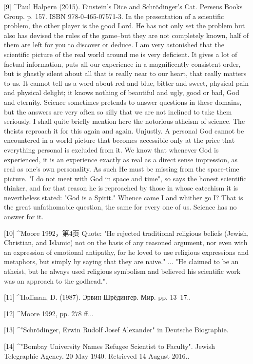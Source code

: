 [9]
^Paul Halpern (2015). Einstein's Dice and Schrödinger's Cat. Perseus Books Group. p. 157. ISBN 978-0-465-07571-3. In the presentation of a scientific problem, the other player is the good Lord. He has not only set the problem but also has devised the rules of the game--but they are not completely known, half of them are left for you to discover or deduce. I am very astonished that the scientific picture of the real world around me is very deficient. It gives a lot of factual information, puts all our experience in a magnificently consistent order, but is ghastly silent about all that is really near to our heart, that really matters to us. It cannot tell us a word about red and blue, bitter and sweet, physical pain and physical delight; it knows nothing of beautiful and ugly, good or bad, God and eternity. Science sometimes pretends to answer questions in these domains, but the answers are very often so silly that we are not inclined to take them seriously. I shall quite briefly mention here the notorious atheism of science. The theists reproach it for this again and again. Unjustly. A personal God cannot be encountered in a world picture that becomes accessible only at the price that everything personal is excluded from it. We know that whenever God is experienced, it is an experience exactly as real as a direct sense impression, as real as one's own personality. As such He must be missing from the space-time picture. "I do not meet with God in space and time", so says the honest scientific thinker, and for that reason he is reproached by those in whose catechism it is nevertheless stated: "God is a Spirit." Whence came I and whither go I? That is the great unfathomable question, the same for every one of us. Science has no answer for it.

[10]
^Moore 1992，第4页 Quote: "He rejected traditional religious beliefs (Jewish, Christian, and Islamic) not on the basis of any reasoned argument, nor even with an expression of emotional antipathy, for he loved to use religious expressions and metaphors, but simply by saying that they are naive." ... "He claimed to be an atheist, but he always used religious symbolism and believed his scientific work was an approach to the godhead.".

[11]
^Hoffman, D. (1987). Эрвин Шрёдингер. Мир. pp. 13–17..

[12]
^Moore 1992, pp. 278 ff...

[13]
^"Schrödinger, Erwin Rudolf Josef Alexander" in Deutsche Biographie.

[14]
^"Bombay University Names Refugee Scientist to Faculty". Jewish Telegraphic Agency. 20 May 1940. Retrieved 14 August 2016..


